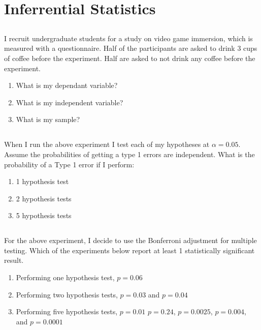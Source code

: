 \documentclass[twocolumn]{article}
\begin{document}
\clearpage
\section{Inferrential Statistics}

\subsection{}

    I recruit undergraduate students for a study on video game immersion, which is measured with a questionnaire. Half of the participants are asked to drink 3 cups of coffee before the experiment. Half are asked to not drink any coffee before the experiment.
    
    \begin{enumerate}
        \item What is my dependant variable?
        \item What is my independent variable?
        \item What is my sample?
    \end{enumerate}

\subsection{}

When I run the above experiment I test each of my hypotheses at $\alpha = 0.05$. Assume the probabilities of getting a type 1 errors are independent. What is the probability of a Type 1 error if I perform:

\begin{enumerate}
    \item 1 hypothesis test
    \item 2 hypothesis tests
    \item 5 hypothesis tests
\end{enumerate}

\subsection{}

For the above experiment, I decide to use the Bonferroni adjustment for multiple testing. Which of the experiments below report at least 1 statistically significant result.

\begin{enumerate}
    \item Performing one hypothesis test, $ p = 0.06 $
    \item Performing two hypothesis tests, $p = 0.03$ and $p=0.04 $
    \item Performing five hypothesis tests, $p = 0.01$ $p=0.24$, $p=0.0025$, $p=0.004$, and $p=0.0001$ 
\end{enumerate}
\end{document}
